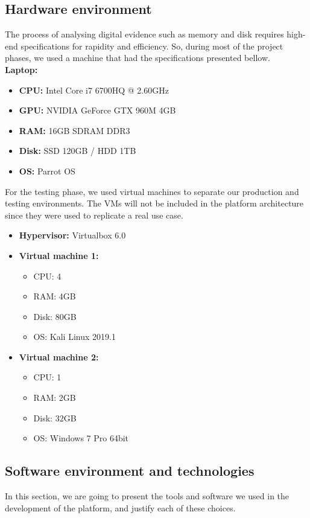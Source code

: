 \subsection{Hardware environment}
The process of analysing digital evidence such as memory and disk requires high-end specifications for rapidity and efficiency. So, during most of the project phases, we used a machine that had the specifications presented bellow.\\
\textbf{Laptop:}
\begin{itemize}
    \item \textbf{CPU:} Intel Core i7 6700HQ @ 2.60GHz
    \item \textbf{GPU:} NVIDIA GeForce GTX 960M 4GB
    \item \textbf{RAM:} 16GB SDRAM DDR3
    \item \textbf{Disk:} SSD 120GB / HDD 1TB
    \item \textbf{OS:} Parrot OS
\end{itemize}
For the testing phase, we used virtual machines to separate our production and testing environments. The VMs will not be included in the platform architecture since they were used to replicate a real use case.
\begin{itemize}
    \item \textbf{Hypervisor:} Virtualbox 6.0
    \item \textbf{Virtual machine 1:} 
        \begin{itemize}
            \item CPU: 4
            \item RAM: 4GB
            \item Disk: 80GB
            \item OS: Kali Linux 2019.1
        \end{itemize}
    \item \textbf{Virtual machine 2:} 
        \begin{itemize}
            \item CPU: 1
            \item RAM: 2GB
            \item Disk: 32GB
            \item OS: Windows 7 Pro 64bit
        \end{itemize}
\end{itemize}

\subsection{Software environment and technologies}
In this section, we are going to present the tools and software we used in the development of the platform, and justify each of these choices.
